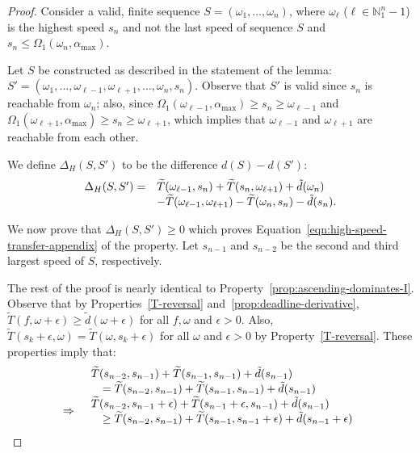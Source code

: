 \begin{proof}
Consider a valid, finite sequence $S = (\omega_1, \ldots, \omega_n)$, where $\omega_\ell$ ($\ell \in \mathbb{N}_1^n-1$) is the highest speed $s_n$ and not the last speed of sequence $S$ and $s_n \leq \Omega_1(\omega_n,\alpha_{\max})$.

Let $S$ be constructed as described in the statement of the lemma:  $S' = (\omega_1, \ldots, \omega_{\ell-1}, \omega_{\ell+1}, \ldots, \omega_n, s_n)$.  Observe that $S'$ is valid since $s_n$ is reachable from $\omega_n$; also, since $\Omega_1(\omega_{\ell-1},\alpha_{\max}) \geq s_n \geq \omega_{\ell-1}$ and $\Omega_1(\omega_{\ell+1},\alpha_{\max}) \geq s_n \geq \omega_{\ell+1}$, which implies that $\omega_{\ell-1}$ and $\omega_{\ell+1}$ are reachable from each other.  

We define $\Delta_H(S,S')$ to be the difference $d(S) - d(S')$:
\begin{equation}\label{eq:tHST}
\begin{array}{ll}
    \Delta_H(S,S') =& \widetilde{T}(\omega_{\ell-1}, s_n) + \widetilde{T}(s_n, \omega_{\ell+1})+  \Tilde{d}(\omega_n)\\
     &- \widetilde{T}(\omega_{\ell-1},\omega_{\ell+1}) - \widetilde{T}(\omega_n, s_n)
        - \Tilde{d}(s_n). 
\end{array}
\end{equation}

We now prove that $\Delta_H(S,S') \geq 0$ which proves Equation~\ref{eqn:high-speed-transfer-appendix} of the property.  Let $s_{n-1}$ and $s_{n-2}$ be the second and third largest speed of $S$, respectively.

The rest of the proof is nearly identical to Property~\ref{prop:ascending-dominates-I}.
Observe that by Properties~\ref{T-reversal} and~\ref{prop:deadline-derivative}, $\widetilde{T}(f,\omega + \epsilon) \geq \tilde{d}(\omega + \epsilon)$ for all $f, \omega$ and $\epsilon > 0$.  Also, $\widetilde{T}(s_k +\epsilon, \omega) = \widetilde{T}(\omega, s_k+\epsilon)$ for all $\omega$ and $\epsilon >0$ by Property~\ref{T-reversal}.  These properties imply that:
\begin{equation}\label{eqn:change-sn}
\begin{array}{ll}
     & 
     \begin{array}{ll}
        \lefteqn{\widetilde{T}(s_{n-2},s_{n-1}) + \widetilde{T}(s_{n-1}, s_{n-1}) + \tilde{d}(s_{n-1})}& \\
            &= \widetilde{T}(s_{n-2},s_{n-1}) + \widetilde{T}(s_{n-1},s_{n-1}) + \tilde{d}(s_{n-1})
      \end{array}\\
     \Rightarrow & 
     \begin{array}{ll}
        \lefteqn{\widetilde{T}(s_{n-2},s_{n-1} +\epsilon) + \widetilde{T}(s_{n-1}+\epsilon, s_{n-1}) + \tilde{d}(s_{n-1})}& \\
        &\geq \widetilde{T}(s_{n-2},s_{n-1}) + \widetilde{T}(s_{n-1}, s_{n-1} + \epsilon) + \tilde{d}(s_{n-1}+\epsilon) 
    \end{array}\\
\end{array}
\end{equation}


\end{proof}
